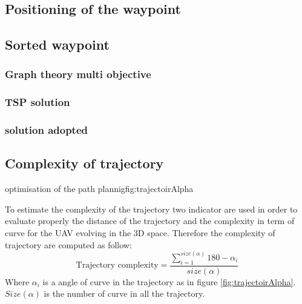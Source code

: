 	
	
			\subsection{Positioning of the waypoint }
			
			

			\subsection{Sorted waypoint}
				\subsubsection{Graph theory multi objective  }
				\subsubsection{TSP solution }
				\subsubsection{solution adopted}
				\subsection{Complexity of trajectory }\label{tarjectory}
%

 \begin{mfigures}[!]{optimisation of the path plannig}{fig:trajectoirAlpha} \centering
{}
\end{mfigures} 

To estimate the complexity of the trajectory two indicator are used in order to evaluate properly the distance of the trajectory and the complexity in term of curve for the UAV evolving in the 3D space.
Therefore the complexity of trajectory are computed as follow: 
\begin{equation}\label{Eq:trajectory}
\mbox{Trajectory complexity}=\frac{ \sum_{i=1}^{size(\alpha)} 180- \alpha_{i}  }{size(\alpha)}   
\end{equation}
Where $\alpha_i$ is a angle of curve in the trajectory as in figure \ref{fig:trajectoirAlpha}. \\
$Size(\alpha)$ is the number of curve in all the trajectory.\\

